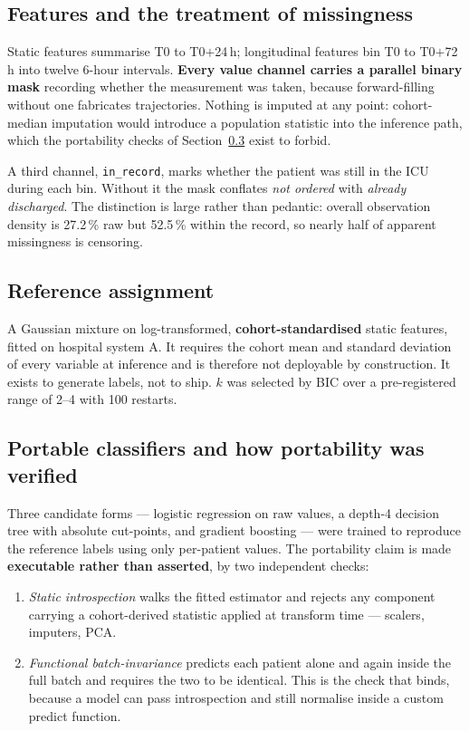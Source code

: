 \documentclass[11pt,letterpaper]{article}
\begin{document}
\subsection{Features and the treatment of missingness}

Static features summarise T0 to T0$+$24\,h; longitudinal features bin T0 to T0$+$72\,h into
twelve 6-hour intervals. \textbf{Every value channel carries a parallel binary mask}
recording whether the measurement was taken, because forward-filling without one fabricates
trajectories. Nothing is imputed at any point: cohort-median imputation would introduce a
population statistic into the inference path, which the portability checks of
Section~\ref{sec:portable} exist to forbid.

A third channel, \texttt{in\_record}, marks whether the patient was still in the ICU during
each bin. Without it the mask conflates \emph{not ordered} with \emph{already discharged}.
The distinction is large rather than pedantic: overall observation density is 27.2\,\% raw
but 52.5\,\% within the record, so nearly half of apparent missingness is censoring.

\subsection{Reference assignment}

A Gaussian mixture on log-transformed, \textbf{cohort-standardised} static features, fitted
on hospital system A. It requires the cohort mean and standard deviation of every variable
at inference and is therefore not deployable by construction. It exists to generate labels,
not to ship. $k$ was selected by BIC over a pre-registered range of 2--4 with 100 restarts.

\subsection{Portable classifiers and how portability was verified}
\label{sec:portable}

Three candidate forms --- logistic regression on raw values, a depth-4 decision tree with
absolute cut-points, and gradient boosting --- were trained to reproduce the reference
labels using only per-patient values. The portability claim is made \textbf{executable
rather than asserted}, by two independent checks:

\begin{enumerate}
\setlength{\itemsep}{1pt}
\item \emph{Static introspection} walks the fitted estimator and rejects any component
      carrying a cohort-derived statistic applied at transform time --- scalers, imputers,
      PCA.
\item \emph{Functional batch-invariance} predicts each patient alone and again inside the
      full batch and requires the two to be identical. This is the check that binds, because
      a model can pass introspection and still normalise inside a custom predict function.
\end{enumerate}
\end{document}
